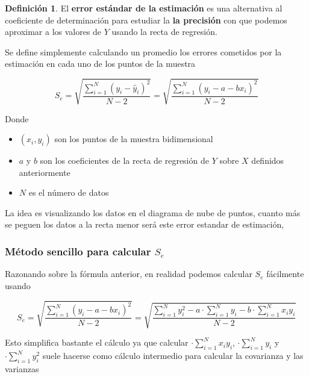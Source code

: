 \documentclass[]{book}
\providecommand{\tightlist}{%
  \setlength{\itemsep}{0pt}\setlength{\parskip}{0pt}}
\theoremstyle{plain}
\theoremstyle{definition}
\newtheorem{definition}[theorem]{Definición}
\begin{document}
\begin{definition}
  El \textbf{error estándar de la estimación} es una alternativa al
coeficiente de determinación para estudiar la \textbf{la precisión} con
que podemos aproximar a los valores de \(Y\) usando la recta de
regresión.

Se define simplemente calculando un promedio los errores cometidos por
la estimación en cada uno de los puntos de la muestra

\[S_e = \sqrt{\frac{\sum^N_{i=1} (y_i - \hat y_i)^2 }{N-2}} = \sqrt{\frac{\sum^N_{i=1} (y_i - a - bx_i)^2 }{N-2}} \]

Donde

\begin{itemize}
\tightlist
\item
  \((x_i, y_i)\) son los puntos de la muestra bidimensional
\item
  \(a\) y \(b\) son los coeficientes de la recta de regresión de \(Y\)
  sobre \(X\) definidos anteriormente
\item
  \(N\) es el número de datos
\end{itemize}

La idea es visualizando los datos en el diagrama de nube de puntos,
cuanto más se peguen los datos a la recta menor será este error estandar
de estimación,
\end{definition}


\subsubsection{Método sencillo para calcular \(S_e\)}

Razonando sobre la fórmula anterior, en realidad podemos calcular
\(S_e\) fácilmente usando

\[S_e =  \sqrt{\frac{\sum^N_{i=1} (y_i - a - bx_i)^2 }{N-2}} =\sqrt{\frac{\sum^N_{i=1} y_i^2 - a \cdot \sum^N_{i=1} y_i - b\cdot \sum^N_{i=1} x_i y_i }{N-2}} \]

Esto simplifica bastante el cálculo ya que calcular
\(\cdot \sum^N_{i=1} x_i y_i\), \(\cdot \sum^N_{i=1} y_i\) y
\(\cdot \sum^N_{i=1} y_i^2\) suele hacerse como cálculo intermedio para
calcular la covarianza y las varianzas
\end{document}
